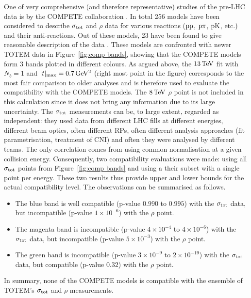 One of very comprehensive (and therefore representative) studies of the pre-LHC data is by the COMPETE collaboration \cite{compete}. In total 256 models have been considered to describe $\sigma_{\rm tot}$ and $\rho$ data for various reactions ($\rm pp$, $\rm p\pi$, $\rm pK$, etc.) and their anti-reactions. Out of these models, 23 have been found to give reasonable description of the data \cite{compete-details}. These models are confronted with newer TOTEM data in Figure~\ref{fig:comp bands}, showing that the COMPETE models form 3 bands plotted in different colours. As argued above, the $13\,{\rm TeV}$ fit with $N_b=1$ and $|t|_{\rm max} = 0.7\,{\rm GeV^2}$ (right most point in the figure) corresponds to the most fair comparison to older analyses and is therefore used to evaluate the compatibility with the COMPETE models. The $8\,{\rm TeV}$ $\rho$ point is not included in this calculation since it does not bring any information due to its large uncertainty. The $\sigma_{\rm tot}$ measurements can be, to large extent, regarded as independent: they used data from different LHC fills at different energies, different beam optics, often different RPs, often different analysis approaches (fit parametrisation, treatment of CNI) and often they were analysed by different teams. The only correlation comes from using common normalisation at a given collision energy. Consequently, two compatibility evaluations were made: using all $\sigma_{\rm tot}$ points from Figure~\ref{fig:comp bands} and using a their subset with a single point per energy. These two results thus provide upper and lower bounds for the actual compatibility level. The observations can be summarised as follows.
\begin{itemize}[noitemsep,topsep=0pt]
\item The blue band is well compatible (p-value $0.990$ to $0.995$) with the $\sigma_{\rm tot}$ data, but incompatible (p-value $1\times10^{-6}$) with the $\rho$ point.
\item The magenta band is incompatible (p-value $4\times10^{-4}$ to $4\times10^{-6}$) with the $\sigma_{\rm tot}$ data, but incompatible (p-value $5\times10^{-3}$) with the $\rho$ point.
\item The green band is incompatible (p-value $3\times10^{-9}$ to $2\times10^{-19}$) with the $\sigma_{\rm tot}$ data, but compatible (p-value $0.32$) with the $\rho$ point.
\end{itemize}
In summary, none of the COMPETE models is compatible with the ensemble of TOTEM's $\sigma_{\rm tot}$ and $\rho$ measurements.

